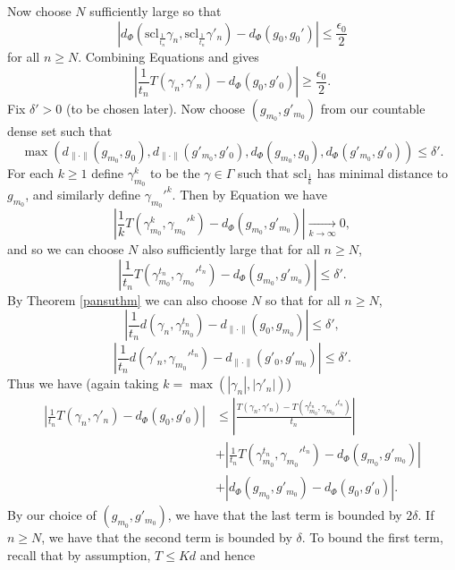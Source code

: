 \documentclass[12pt,reqno]{article}
\makeatletter
\let\reftagform@=\tagform@
\def\tagform@#1{\maketag@@@{(\ignorespaces\textcolor{purple}{#1}\unskip\@@italiccorr)}}
\renewcommand{\eqref}[1]{\textup{\reftagform@{\ref{#1}}}}
\numberwithin{equation}{section}
\newcommand{\tendsto}[2]{\xrightarrow[#1 \to #2]{}}
\newcommand{\scl}{\mathrm{scl}}
\makeatother
\begin{document}
Now choose $N$ sufficiently large so that
\begin{equation} \label{eq:discreteapproximationclose}
   |d_{\Phi}( \scl_{\frac{1}{t_n}} \gamma_n, \scl_{\frac{1}{t_n}} \gamma'_n)
   - d_{\Phi}(g_0,g_0')| \le \frac{\epsilon_0}{2}
\end{equation}
for all $n \ge N$.
Combining Equations \eqref{eq:counterexample} and \eqref{eq:discreteapproximationclose} gives
\begin{equation} \label{eq:contradict}
   |\frac{1}{t_n} T(\gamma_n, \gamma'_n) - d_{\Phi}(g_0, g'_0) | \ge \frac{\epsilon_0}{2}.
\end{equation}
Fix $\delta' > 0$ (to be chosen later).
Now choose $(g_{m_0}, g'_{m_0})$ from our countable dense set such that
\[
   \max( d_{\| \cdot \|}(g_{m_0}, g_0), d_{\| \cdot \|}(g'_{m_0}, g'_0), d_{\Phi}(g_{m_0}, g_0), d_{\Phi}(g'_{m_0}, g'_0)) \le \delta'.
\]
For each $k \ge 1$ define $\gamma_{m_0}^k$ to be the $\gamma \in \Gamma$ such that $\scl_{\frac{1}{k}}$ has minimal
distance to $g_{m_0}$, and similarly define $\gamma_{m_0}'^k$.
Then by Equation \eqref{eq:ptwise} we have
\[
   \left| \frac{1}{k} T(\gamma_{m_0}^k, \gamma_{m_0}'^k) - d_{\Phi}(g_{m_0}, g'_{m_0}) \right| \tendsto{k}{\infty} 0,
\]
and so we can choose $N$ also sufficiently large that for all $n \ge N$,
\[
   \left| \frac{1}{t_n} T(\gamma_{m_0}^{t_n}, \gamma_{m_0}'^{t_n}) - d_{\Phi}(g_{m_0}, g'_{m_0}) \right| \le \delta'.
\]
By Theorem \ref{pansuthm} we can also choose $N$ so that for all $n \ge N$,
\[
   \left| \frac{1}{t_n} d(\gamma_n, \gamma_{m_0}^{t_n}) - d_{\| \cdot \|}( g_0, g_{m_0}) \right|
   \le \delta',
\]
\[
   \left| \frac{1}{t_n} d(\gamma'_n, \gamma_{m_0}'^{t_n}) - d_{\| \cdot \|}( g'_0, g'_{m_0} ) \right|
   \le \delta'.
\]
Thus we have (again taking $k=\max(|\gamma_n|, |\gamma'_n|)$)
\begin{align*}
   \left| \frac{1}{t_n} T(\gamma_n, \gamma'_n) - d_{\Phi}(g_0,g'_0) \right| 
   &\le \left| \frac{ T(\gamma_n, \gamma'_n) - T(\gamma_{m_0}^{t_n}, \gamma_{m_0}'^{t_n}) }{ t_n } \right| \\
   &+ \left| \frac{1}{t_n} T(\gamma_{m_0}^{t_n}, \gamma_{m_0}'^{t_n}) - d_{\Phi}(g_{m_0}, g'_{m_0}) \right| \\
   &+ | d_{\Phi}(g_{m_0}, g'_{m_0}) - d_{\Phi}(g_0,g'_0)|.
\end{align*}
By our choice of $(g_{m_0}, g'_{m_0})$, we have that the last term is bounded by $2 \delta$.
If $n \ge N$, we have that the second term is bounded by $\delta$.
To bound the first term, recall that by assumption, $T \le Kd$ and hence
\end{document}
